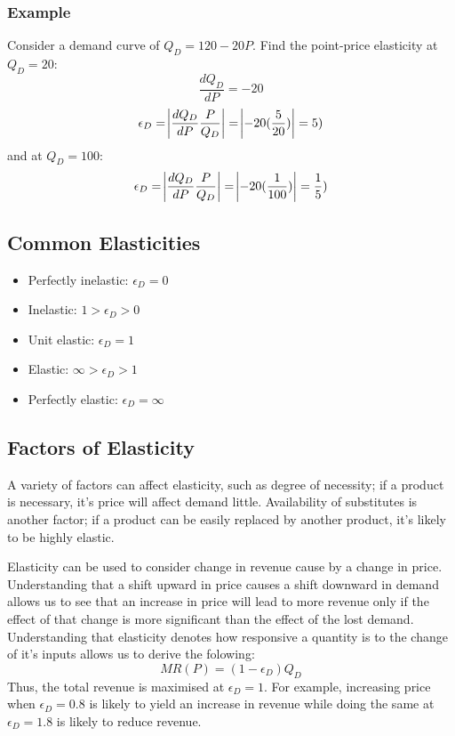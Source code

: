 \documentclass[12pt]{report}
\begin{document}
\begin{flushleft}
\subsubsection*{Example}
Consider a demand curve of \(Q_D = 120 - 20P\). Find the point-price elasticity at \(Q_D = 20\):
\[\frac{dQ_D}{dP} = -20\]
\[\epsilon_D = \abs{\frac{dQ_D}{dP}\frac{P}{Q_D}} = \abs{-20(\frac{5}{20})} = 5)\]
and at \(Q_D = 100\):
\[\epsilon_D = \abs{\frac{dQ_D}{dP}\frac{P}{Q_D}} = \abs{-20(\frac{1}{100})} = \frac{1}{5})\]

\subsection*{Common Elasticities}
\begin{itemize}
    \item Perfectly inelastic: \(\epsilon_D = 0\)
    \item Inelastic: \(1 > \epsilon_D > 0\)
    \item Unit elastic: \(\epsilon_D = 1\)
    \item Elastic: \(\infty > \epsilon_D > 1\)
    \item Perfectly elastic: \(\epsilon_D = \infty\)
\end{itemize}

\subsection*{Factors of Elasticity}
A variety of factors can affect elasticity, such as degree of necessity; if a product is necessary,
it's price will affect demand little. Availability of substitutes is another factor; if a product
can be easily replaced by another product, it's likely to be highly elastic.

\bigskip
Elasticity can be used to consider change in revenue cause by a change in price. Understanding that 
a shift upward in price causes a shift downward in demand allows us to see that an increase in 
price will lead to more revenue only if the effect of that change is more significant than the 
effect of the lost demand. Understanding that elasticity denotes how responsive a quantity is 
to the change of it's inputs allows us to derive the folowing:
\[MR(P) = (1 - \epsilon_D)Q_D\]
Thus, the total revenue is maximised at \(\epsilon_D = 1\). For example, increasing price when \(\epsilon_D = 0.8\)
is likely to yield an increase in revenue while doing the same at \(\epsilon_D = 1.8\) is likely to
reduce revenue. 


\end{flushleft}
\end{document}
